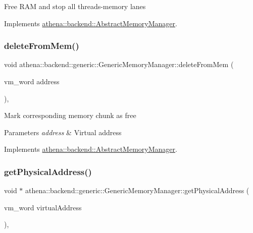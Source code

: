 Free R\+AM and stop all threads-\/memory lanes 

Implements \mbox{\hyperlink{classathena_1_1backend_1_1_abstract_memory_manager}{athena\+::backend\+::\+Abstract\+Memory\+Manager}}.

\mbox{\label{classathena_1_1backend_1_1generic_1_1_generic_memory_manager_a2767b6c1f5887a2928b665e0c1b454c7}} 
\subsubsection{\texorpdfstring{delete\+From\+Mem()}{deleteFromMem()}}
{\footnotesize\ttfamily void athena\+::backend\+::generic\+::\+Generic\+Memory\+Manager\+::delete\+From\+Mem (\begin{DoxyParamCaption}\item[{vm\+\_\+word}]{address }\end{DoxyParamCaption})\hspace{0.3cm}{\ttfamily [override]}, {\ttfamily [virtual]}}

Mark corresponding memory chunk as free 
\begin{DoxyParams}{Parameters}
{\em address} & Virtual address \\
\hline
\end{DoxyParams}


Implements \mbox{\hyperlink{classathena_1_1backend_1_1_abstract_memory_manager_a8ffd6cf21559978f394e2e11815506b5}{athena\+::backend\+::\+Abstract\+Memory\+Manager}}.

\mbox{\label{classathena_1_1backend_1_1generic_1_1_generic_memory_manager_a7f3dacb56bd95b837910441d0aef1dd8}} 
\subsubsection{\texorpdfstring{get\+Physical\+Address()}{getPhysicalAddress()}}
{\footnotesize\ttfamily void $\ast$ athena\+::backend\+::generic\+::\+Generic\+Memory\+Manager\+::get\+Physical\+Address (\begin{DoxyParamCaption}\item[{vm\+\_\+word}]{virtual\+Address }\end{DoxyParamCaption})\hspace{0.3cm}{\ttfamily [override]}, {\ttfamily [virtual]}}

